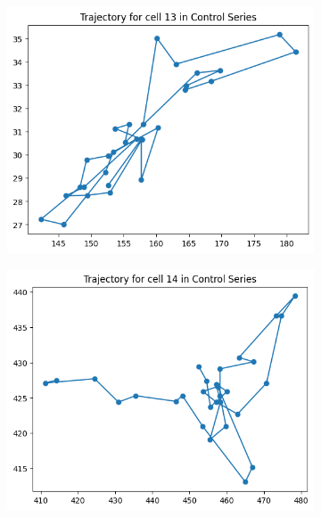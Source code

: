 \documentclass{article}
\begin{document}
\clearpage

\begin{figure}[h!]
    \centering
    \begin{subfigure}[b]{0.5\linewidth}
        \centering
        \includegraphics[width=\linewidth]{Report/Appendix_Images/Trajectory-A-Control/trajectory_13.png}
        \caption{}
    \end{subfigure}%
    \begin{subfigure}[b]{0.5\linewidth}
        \centering
        \includegraphics[width=\linewidth]{Report/Appendix_Images/Trajectory-A-Control/trajectory_14.png}
        \caption{}
    \end{subfigure}

\end{figure}
\end{document}
